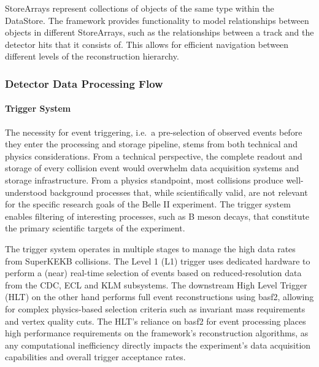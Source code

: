 StoreArrays represent collections of objects of the same type within the DataStore.
The framework provides functionality to model relationships between objects in different StoreArrays, such as the relationships between a track and the detector hits that it consists of.
This allows for efficient navigation between different levels of the reconstruction hierarchy.

\subsubsection{Detector Data Processing Flow}\label{sec:processing-pipeline}
\paragraph{Trigger System}
The necessity for event triggering, i.e.\ a pre-selection of observed events before they enter the processing and storage pipeline, stems from both technical and physics considerations.
From a technical perspective, the complete readout and storage of every collision event would overwhelm data acquisition systems and storage infrastructure.
From a physics standpoint, most collisions produce well-understood background processes that, while scientifically valid, are not relevant for the specific research goals of the Belle II experiment.
The trigger system enables filtering of interesting processes, such as B meson decays, that constitute the primary scientific targets of the experiment.

The trigger system operates in multiple stages to manage the high data rates from SuperKEKB collisions. 
The Level 1 (L1) trigger uses dedicated hardware to perform a (near) real-time selection of events based on reduced-resolution data from the CDC, ECL and KLM subsystems.
The downstream High Level Trigger (HLT) on the other hand performs full event reconstructions using basf2, allowing for complex physics-based selection criteria such as invariant mass requirements and vertex quality cuts.
The HLT's reliance on basf2 for event processing places high performance requirements on the framework's reconstruction algorithms, as any computational inefficiency directly impacts the experiment's data acquisition capabilities and overall trigger acceptance rates.

